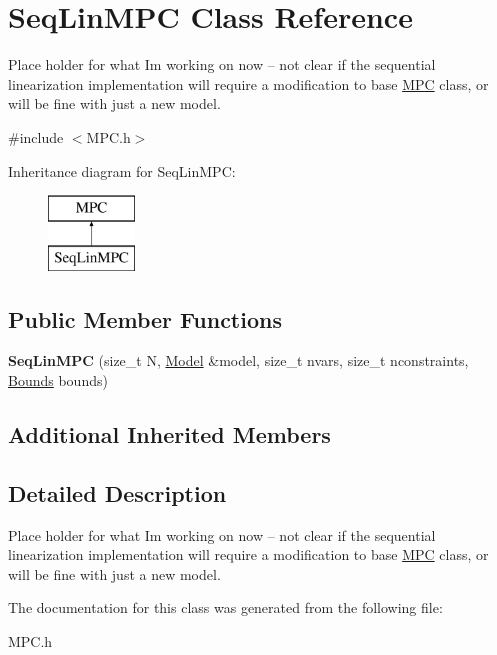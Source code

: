 \hypertarget{classSeqLinMPC}{}\section{Seq\+Lin\+M\+PC Class Reference}
\label{classSeqLinMPC}


Place holder for what I\textquotesingle{}m working on now -- not clear if the sequential linearization implementation will require a modification to base \mbox{\hyperlink{classMPC}{M\+PC}} class, or will be fine with just a new model.  




{\ttfamily \#include $<$M\+P\+C.\+h$>$}

Inheritance diagram for Seq\+Lin\+M\+PC\+:\begin{figure}[H]
\begin{center}
\leavevmode
\includegraphics[height=2.000000cm]{classSeqLinMPC}
\end{center}
\end{figure}
\subsection*{Public Member Functions}
\begin{DoxyCompactItemize}
\item 
\mbox{\label{classSeqLinMPC_a29539e2f48b73e2896fb4a9246b1f3cb}} 
{\bfseries Seq\+Lin\+M\+PC} (size\+\_\+t N, \mbox{\hyperlink{classModel}{Model}} \&model, size\+\_\+t nvars, size\+\_\+t nconstraints, \mbox{\hyperlink{structBounds}{Bounds}} bounds)
\end{DoxyCompactItemize}
\subsection*{Additional Inherited Members}


\subsection{Detailed Description}
Place holder for what I\textquotesingle{}m working on now -- not clear if the sequential linearization implementation will require a modification to base \mbox{\hyperlink{classMPC}{M\+PC}} class, or will be fine with just a new model. 

The documentation for this class was generated from the following file\+:\begin{DoxyCompactItemize}
\item 
M\+P\+C.\+h\end{DoxyCompactItemize}

